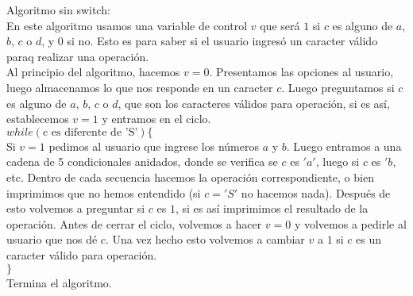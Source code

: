 \documentclass{article}
\begin{document}
Algoritmo sin switch:\\

En este algoritmo usamos una variable de control $v$ que será $1$ si $c$ es alguno de $a$, $b$, $c$ o $d$, y $0$ si no. Esto es para saber si el usuario ingresó un caracter válido paraq realizar una operación.\\

Al principio del algoritmo, hacemos $v = 0$. Presentamos las opciones al usuario, luego almacenamos lo que nos responde en un caracter $c$. Luego preguntamos si $c$ es alguno de $a$, $b$, $c$ o $d$, que son los caracteres válidos para operación, si es así, establecemos $v = 1$ y entramos en el ciclo.\\

$while(\text{c es diferente de 'S'})\{$\\ 

Si $v = 1$ pedimos al usuario que ingrese los números $a$ y $b$. Luego entramos a una cadena de 5 condicionales anidados, donde se verifica se $c$ es $'a'$, luego si $c$ es $'b$, etc. Dentro de cada secuencia hacemos la operación correspondiente, o bien imprimimos que no hemos entendido (si $c = 'S'$ no hacemos nada). Después de esto volvemos a preguntar si $c$ es $1$, si es así imprimimos el resultado de la operación. Antes de cerrar el ciclo, volvemos a hacer $v = 0$ y volvemos a pedirle al usuario que nos dé $c$. Una vez hecho esto volvemos a cambiar $v$ a $1$ si $c$ es un caracter válido para operación.\\

$\}$\\

Termina el algoritmo.
\end{document}

